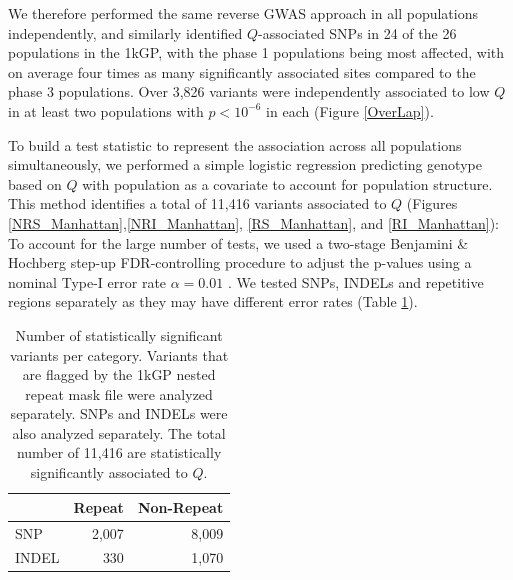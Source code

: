 \documentclass[9pt,lineno]{elife}
\begin{document}
We therefore performed the same reverse GWAS approach in all populations independently, and similarly identified $Q$-associated SNPs in 24 of the 26 populations in the 1kGP, with the phase 1 populations being most affected, with on average four times as many significantly associated sites compared to the phase 3 populations.
Over 3,826 variants were independently associated to low $Q$ in at least two populations with $ p < 10^{-6}$ in each (Figure \ref{OverLap}).

To build a test statistic to represent the association across all populations simultaneously, we performed a simple logistic regression predicting genotype based on $Q$ with population as a covariate to account for population structure.
This method identifies a total of 11,416 variants associated to $Q$ (Figures \ref{NRS_Manhattan},\ref{NRI_Manhattan}, \ref{RS_Manhattan}, and \ref{RI_Manhattan}): 
To account for the large number of tests, we used a two-stage Benjamini \& Hochberg step-up FDR-controlling procedure to adjust the p-values using a nominal Type-I error rate $\alpha = 0.01$ \citep{Benjamini2006}. We tested SNPs, INDELs and repetitive regions separately as they may have different error rates (Table \ref{sigTable}).

\begin{table}[h]
\centering
\begin{tabular}{l  r r}
                      & {Repeat}  & {Non-Repeat}       \\ \hline
{SNP}  & 2,007 & 8,009 \\  
{INDEL} & 330 & 1,070 \\ \hline
\end{tabular}
\caption{Number of statistically significant variants per category. Variants that are flagged by the 1kGP nested repeat mask file were analyzed separately. SNPs and INDELs were also analyzed separately. The total number of 11,416 are statistically significantly associated to $Q$.}
\label{sigTable}
\end{table}
\end{document}
